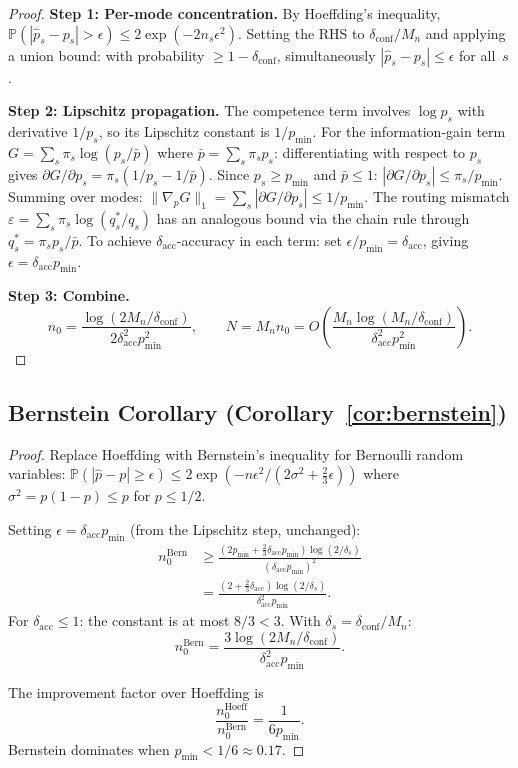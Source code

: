 \documentclass[twoside,11pt]{article}
\newcommand{\Prb}{\mathbb{P}}
\newcommand{\Mn}{M_n}
\newcommand{\pmin}{p_{\min}}
\newcommand{\dacc}{\delta_{\mathrm{acc}}}
\newcommand{\dconf}{\delta_{\mathrm{conf}}}
\newcommand{\mismatch}{\varepsilon}
\begin{document}
\begin{proof}
\noindent\textbf{Step 1: Per-mode concentration.}
By Hoeffding's inequality, $\Prb(|\hat{p}_s - p_s| > \epsilon) \le 2\exp(-2n_s\epsilon^2)$.
Setting the RHS to $\dconf/\Mn$ and applying a union bound: with probability $\ge 1-\dconf$, simultaneously $|\hat{p}_s - p_s| \le \epsilon$ for all~$s$.

\noindent\textbf{Step 2: Lipschitz propagation.}
The competence term involves $\log p_s$ with derivative $1/p_s$, so its Lipschitz constant is $1/\pmin$.
For the information-gain term $G = \sum_s \pi_s \log(p_s / \bar{p})$ where $\bar{p} = \sum_s \pi_s p_s$: differentiating with respect to $p_s$ gives $\partial G / \partial p_s = \pi_s(1/p_s - 1/\bar{p})$.
Since $p_s \ge \pmin$ and $\bar{p} \le 1$: $|\partial G / \partial p_s| \le \pi_s / \pmin$.
Summing over modes: $\|\nabla_p G\|_1 = \sum_s |\partial G / \partial p_s| \le 1/\pmin$.
The routing mismatch $\mismatch = \sum_s \pi_s \log(q_s^*/q_s)$ has an analogous bound via the chain rule through $q_s^* = \pi_s p_s / \bar{p}$.
To achieve $\dacc$-accuracy in each term: set $\epsilon/\pmin = \dacc$, giving $\epsilon = \dacc\pmin$.

\noindent\textbf{Step 3: Combine.}
\[
  n_0=\frac{\log(2\Mn/\dconf)}{2\dacc^2\pmin^2},
  \qquad
  N=\Mn n_0
  =O\!\left(
    \frac{\Mn\log(\Mn/\dconf)}{\dacc^2\pmin^2}
  \right).
\]
\end{proof}

\subsection{Bernstein Corollary (Corollary~\ref{cor:bernstein})}
\label{app:bernstein}

\begin{proof}
Replace Hoeffding with Bernstein's inequality for Bernoulli random variables:
$\Prb(|\hat{p} - p| \ge \epsilon) \le 2\exp(-n\epsilon^2 / (2\sigma^2 + \frac{2}{3}\epsilon))$
where $\sigma^2 = p(1-p) \le p$ for $p \le 1/2$.

Setting $\epsilon = \dacc\pmin$ (from the Lipschitz step, unchanged):
\begin{align}
  n_0^{\mathrm{Bern}}
  &\ge \frac{(2\pmin + \frac{2}{3}\dacc\pmin)
                   \log(2/\delta_s)}{(\dacc\pmin)^2} \\
  &= \frac{(2 + \frac{2}{3}\dacc)\log(2/\delta_s)}
           {\dacc^2\pmin}.
\end{align}
For $\dacc \le 1$: the constant is at most $8/3 < 3$.
With $\delta_s = \dconf/\Mn$:
\[
  n_0^{\mathrm{Bern}}
  =\frac{3\log(2\Mn/\dconf)}{\dacc^2\pmin}.
\]

The improvement factor over Hoeffding is
\[
  \frac{n_0^{\mathrm{Hoeff}}}{n_0^{\mathrm{Bern}}}
  =\frac{1}{6\pmin}.
\]
Bernstein dominates when $\pmin < 1/6 \approx 0.17$.
\end{proof}
\end{document}
